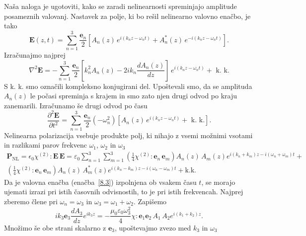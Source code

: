 Naša naloga
je ugotoviti, kako se zaradi nelinearnosti spreminjajo amplitude posameznih valovanj.
Nastavek za polje, ki bo rešil nelinearno valovno enačbo, je tako
\begin{equation}
\mathbf{E}(z,t) = \sum_{n=1}^3 \frac{\mathbf{e}_{n}}{2}\left[A_{n}(z)\, 
e^{i(k_{n}z-\omega_{n}t)}+A_{n}^{*}(z)\, e^{-i(k_{n}z-\omega_{n}t)}\right].
\label{eq:nlnastavek}
\end{equation}
Izračunajmo najprej 
\begin{equation}
\nabla^{2}\mathbf{E}=-\sum_{n=1}^3 \frac{\mathbf{e}_{n}}{2}\left[k_{n}^{2}A_{n}(z)-2ik_{n}
\frac{dA_{n}(z)}{dz}\right]\, e^{i(k_{n}z-\omega_{n}t)}+\mbox{ k. k.}
\label{8.5}
\end{equation}
S k. k. smo označili kompleksno konjugirani del. Upoštevali smo,
da se amplituda $A_{n}(z)$ le počasi spreminja s krajem in smo zato njen
drugi odvod po kraju zanemarili.
Izračunamo še drugi odvod po času 
\begin{equation}
\frac{\partial^2\mathbf{E}}{\partial t^2}=\sum_{n=1}^3 \frac{\mathbf{e}_{n}}{2}
\left(-\omega_n^2\right) \left[A_{n}(z)\, e^{i(k_{n}z-\omega_{n}t)}+\mbox{ k. k.}\right].
\label{8.5a}
\end{equation}
Nelinearna polarizacija vsebuje produkte polj, ki nihajo z vsemi možnimi
vsotami in razlikami parov frekvenc $\omega_{1}$, $\omega_{2}$ in
$\omega_{3}$
\begin{multline}
\mathbf{P}_{\mathrm{NL}}= \epsilon_{0}\chi^{(2)}:\mathbf{E}\, \mathbf{E} =
\varepsilon_0 \sum_{n=1}^3 \sum_{m=1}^3 
 \left( \frac{1}{4} \chi^{(2)}:\mathbf{e}_{n}\,\mathbf{e}_{m}\right) 
 A_{n}(z)\,A_{m}(z) e^{i(k_{n}+k_{m})z-i(\omega_{n}+\omega_{m})t}+  \\
\left( \frac{1}{4} \chi^{(2)}:\mathbf{e}_{n}\,\mathbf{e}_{m}\right)
A_{n}(z)\,A_{m}^*(z) e^{i(k_{n}-k_{m})z-i(\omega_{n}-\omega_{m})t}+ \mathrm{k. k.}
\label{8.5b}
\end{multline}
Da je valovna enačba (enačba~\ref{8.3}) izpolnjena ob vsakem času $t$, se morajo
ujemati izrazi pri istih časovnih odvisnostih, to je pri istih frekvencah. Najprej 
zberemo člene pri $\omega_n = \omega_3$ in $\omega_3 = \omega_1 + \omega_2$. Zapišemo
\begin{equation}
ik_{3}\mathbf{e}_{3}\frac{dA_{3}}{dz}e^{ik_{3}z}=-\frac{\mu_{0} 
\varepsilon_0 \omega_{3}^{2}}{4}\chi:\mathbf{e}_{1}\mathbf{e}_{2}\,A_{1}\,A_{2}e^{i(k_{1}+k_{2})z}.
\label{8.7}
\end{equation}
Množimo še obe strani skalarno z $\mathbf{e}_{3}$, upoštevajmo zvezo med $k_{3}$ in $\omega_{3}$
